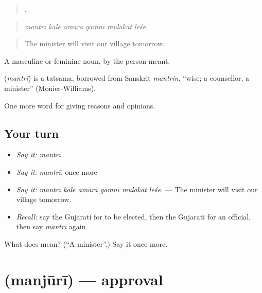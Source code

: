 \begin{quote}
     .
\end{quote}

\begin{quote}
\emph{mantrī kāle amārā gāmnī mulākāt leśe.}
\end{quote}

\begin{quote}
The minister will visit our village tomorrow.
\end{quote}

A masculine or feminine noun, by the person meant.

\begin{cousinweb}
\textbf{} (\emph{mantrī}) is a tatsama, borrowed from Sanskrit \emph{mantrin}, \textquotedblleft{}wise; a counsellor, a minister\textquotedblright{} (Monier-Williams).
\end{cousinweb}

\begin{grammarlens}[title={What you've built}]
One more word for giving reasons and opinions.
\end{grammarlens}

\subsection*{Your turn}
\begin{itemize}
\raggedright
  \item \emph{Say it:} \emph{mantrī}
  \item \emph{Say it:} \emph{mantrī}, once more
  \item \emph{Say it:} \emph{mantrī kāle amārā gāmnī mulākāt leśe.} — The minister will visit our village tomorrow.
  \item \emph{Recall:} say the Gujarati for to be elected, then the Gujarati for an official, then say \emph{mantrī} again
\end{itemize}

\begin{tcolorbox}[breakable,colback=teal!4,colframe=teal!35!black,title={Before you move on}]
What does  mean? (\textquotedblleft{}A minister\textquotedblright{}.) Say it once more.
\end{tcolorbox}
\section[\texorpdfstring{\gu{મંજૂરી} (manjūrī)}{મંજૂરી (manjūrī)}]{ (manjūrī) — approval}


